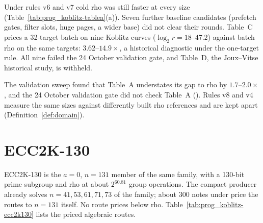Under rules v6 and v7 cold rho was still faster at every size
(Table~\ref{tab:prog_koblitz-tablea}(a)). Seven further baseline candidates (prefetch gates,
filter slots, huge pages, a wider base) did not clear their rounds.
Table~C prices a 32-target batch on nine Koblitz curves ($\log_2 r=18$--$47.2$)
against batch rho on the same targets: $3.62$--$14.9\times$, a historical
diagnostic under the one-target rule. All nine failed the 24 October
validation gate, and Table~D, the Joux--Vitse historical study, is withheld.

The validation sweep found that Table~A understates its gap to rho by
$1.7$--$2.0\times$, and the 24 October validation gate did not check Table~A
(). Rules v8 and v4 measure the
same sizes against differently built rho references and are kept apart
(Definition~\ref{def:domain}).

\section{ECC2K-130}\label{sec:ecc2k130}

ECC2K-130 is the $a=0$, $n=131$ member of the same family, with a 130-bit
prime subgroup and rho at about $2^{60.81}$ group operations. The compact
producer already solves $n=41,53,61,71,73$ of the family; about 300 notes
under  price the routes to $n=131$ itself. No
route prices below rho.
Table~\ref{tab:prog_koblitz-ecc2k130} lists the priced algebraic routes.

